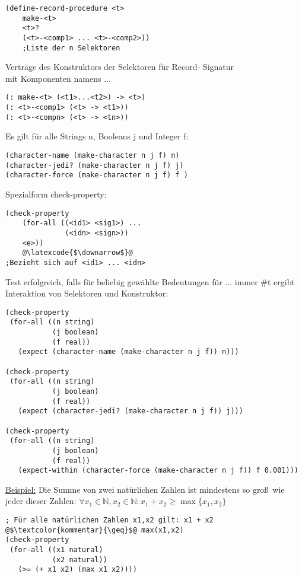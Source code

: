 \begin{lstlisting}
(define-record-procedure <t>
	make-<t>
	<t>?
	(<t>-<comp1> ... <t>-<comp2>))
	;Liste der n Selektoren
\end{lstlisting}
Verträge des Konstruktors\/ der Selektoren für Record- Signatur\\
\argt{} mit Komponenten namens  $\ldots$ \\
\begin{lstlisting}
(: make-<t> (<t1>...<t2>) -> <t>)
(: <t>-<comp1> (<t> -> <t1>))
(: <t>-<compn> (<t> -> <tn>))
\end{lstlisting}
Es gilt für alle Strings n, Booleans j und Integer f:
\begin{lstlisting}
(character-name (make-character n j f) n)
(character-jedi? (make-character n j f) j)
(character-force (make-character n j f) f )
\end{lstlisting}
Spezialform check-property:\\
\begin{lstlisting}
(check-property
	(for-all ((<id1> <sig1>) ... 
			  (<idn> <sign>))
	<e>))
	@\latexcode{$\downarrow$}@
;Bezieht sich auf <id1> ... <idn>	
\end{lstlisting}
Test erfolgreich, falls \arge{} für beliebig gewählte Bedeutungen für  $\ldots$  immer \#t ergibt\\
Interaktion von Selektoren und Konstruktor:
\begin{lstlisting}[frame=listing]
(check-property 
 (for-all ((n string)
           (j boolean)
           (f real))
   (expect (character-name (make-character n j f)) n)))

(check-property 
 (for-all ((n string)
           (j boolean)
           (f real))
   (expect (character-jedi? (make-character n j f)) j)))

(check-property 
 (for-all ((n string)
           (j boolean)
           (f real))
   (expect-within (character-force (make-character n j f)) f 0.001)))
\end{lstlisting}
\underline{Beispiel:} Die Summe von zwei natürlichen Zahlen ist mindestens so gro\ss \ wie jeder dieser Zahlen: $ \forall x_1 \in \mathbb{N}, x_2 \in \mathbb{N} : x_1 + x_2 \geq \max\{x_1,x_2\}$
\begin{lstlisting}[frame=single]
; Für alle natürlichen Zahlen x1,x2 gilt: x1 + x2 @$\textcolor{kommentar}{\geq}$@ max(x1,x2)
(check-property
 (for-all ((x1 natural)
           (x2 natural))
   (>= (+ x1 x2) (max x1 x2))))
\end{lstlisting}
